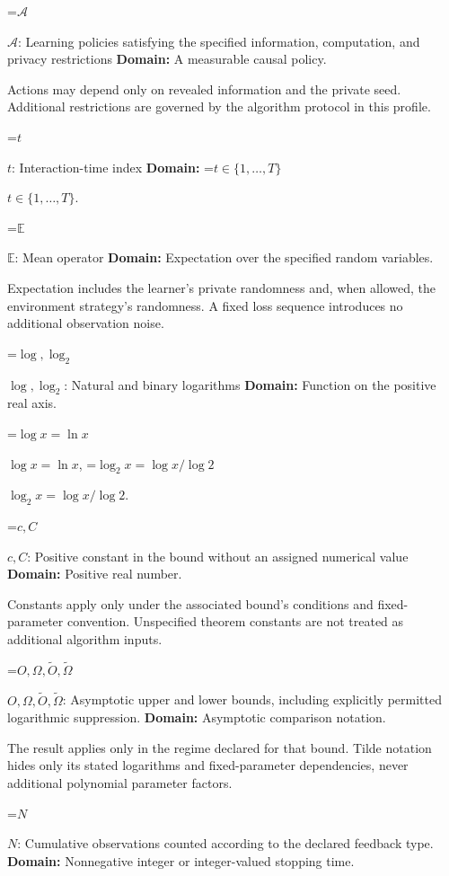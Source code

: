 \documentclass[10pt,a4paper]{article}
\newcommand{\AtlasMath}[1]{\par\begingroup\centering\setbox0=\hbox{$\displaystyle #1$}\ifdim\wd0>1.4\linewidth\typeout{ATLAS WIDE FORMULA: \the\wd0}\fi\ifdim\wd0>\linewidth\resizebox{\linewidth}{!}{\box0}\else\box0\fi\par\endgroup}
\newcommand{\AtlasInlineMath}[1]{\begingroup\setbox0=\hbox{$#1$}\ifdim\wd0>.4\linewidth\endgroup\AtlasMath{#1}\else\endgroup$#1$\fi}
\begin{document}
\AtlasInlineMath{\mathcal A}: Learning policies satisfying the specified information, computation, and privacy restrictions \textbf{Domain:} A measurable causal policy.



Actions may depend only on revealed information and the private seed. Additional restrictions are governed by the algorithm protocol in this profile.



\AtlasInlineMath{t}: Interaction-time index \textbf{Domain:} \AtlasInlineMath{t\in\{1,\ldots,T\}}.



\AtlasInlineMath{\mathbb E}: Mean operator \textbf{Domain:} Expectation over the specified random variables.



Expectation includes the learner's private randomness and, when allowed, the environment strategy's randomness. A fixed loss sequence introduces no additional observation noise.



\AtlasInlineMath{\log,\log_2}: Natural and binary logarithms \textbf{Domain:} Function on the positive real axis.



\AtlasInlineMath{\log x=\ln x}, \AtlasInlineMath{\log_2x=\log x/\log2}.



\AtlasInlineMath{c,C}: Positive constant in the bound without an assigned numerical value \textbf{Domain:} Positive real number.



Constants apply only under the associated bound’s conditions and fixed-parameter convention. Unspecified theorem constants are not treated as additional algorithm inputs.



\AtlasInlineMath{O,\Omega,\widetilde O,\widetilde\Omega}: Asymptotic upper and lower bounds, including explicitly permitted logarithmic suppression. \textbf{Domain:} Asymptotic comparison notation.



The result applies only in the regime declared for that bound. Tilde notation hides only its stated logarithms and fixed-parameter dependencies, never additional polynomial parameter factors.



\AtlasInlineMath{N}: Cumulative observations counted according to the declared feedback type. \textbf{Domain:} Nonnegative integer or integer-valued stopping time.
\end{document}
